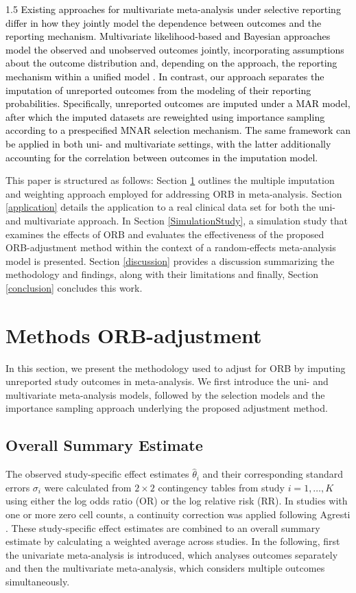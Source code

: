 \documentclass{article}
\newcommand{\mycolor}[1]{\textcolor{black}{#1}}
\begin{document}
\begin{spacing}{1.5}
\mycolor{Existing approaches for multivariate meta-analysis under selective reporting differ in how they jointly model the dependence between outcomes and the reporting mechanism. Multivariate likelihood-based and Bayesian approaches model the observed and unobserved outcomes jointly, incorporating assumptions about the outcome distribution and, depending on the approach, the reporting mechanism within a unified model \cite{bai2021bayesian,hwang2018multivariate,liu2018bayesian}. In contrast, our approach separates the imputation of unreported outcomes from the modeling of their reporting probabilities. Specifically, unreported outcomes are imputed under a MAR model, after which the imputed datasets are reweighted using importance sampling according to a prespecified MNAR selection mechanism. The same framework can be applied in both uni- and multivariate settings, with the latter additionally accounting for the correlation between outcomes in the imputation model.} 

This paper is structured as follows: Section \ref{Methods} outlines the multiple imputation and weighting approach employed for addressing ORB in meta-analysis. Section \ref{application} details the application to a real clinical data set for both the uni- and multivariate approach. In Section \ref{SimulationStudy}, a simulation study that examines the effects of ORB and evaluates the effectiveness of the proposed ORB-adjustment method within the context of a random-effects meta-analysis model is presented. Section \ref{discussion} provides a discussion summarizing the methodology and findings, along with their limitations and finally, Section \ref{conclusion} concludes this work.

\section{Methods ORB-adjustment} \label{Methods}

In this section, we present the methodology used to adjust for ORB by imputing unreported study outcomes in meta-analysis. We first introduce the uni- and multivariate meta-analysis models, followed by the selection models and the importance sampling approach underlying the proposed adjustment method.

\subsection{Overall Summary Estimate}
The observed study-specific effect estimates $\hat\theta_i$ and their corresponding standard errors $\sigma_i$ were calculated from $2 \times 2$ contingency tables from study $i = 1, \dots, K$ using either the log odds ratio (OR) or the log relative risk (RR). In studies with one or more zero cell counts, a continuity correction was applied following Agresti \cite[p. 71]{agresti2013categorical}. These study-specific effect estimates are combined to an overall summary estimate by calculating a weighted average across studies. In the following, first the univariate meta-analysis is introduced, which analyses outcomes separately and then the multivariate meta-analysis, which considers multiple outcomes simultaneously. 


\end{spacing}
\end{document}

